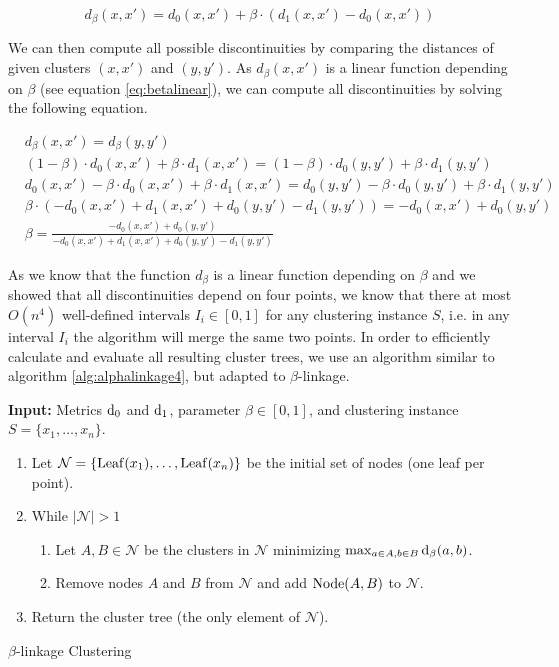 \begin{equation}
d_\beta(x,x') = d_0(x,x') + \beta \cdot (d_1(x,x') - d_0(x,x'))
\label{eq:betalinear}
\end{equation}

We can then compute all possible discontinuities by comparing the distances of given clusters $(x, x')$ and $(y, y')$. As $d_\beta(x,x')$ is a linear function depending on $\beta$ (see equation \ref{eq:betalinear}), we can compute all discontinuities by solving the following equation.

\begin{align*}
&d_\beta(x,x') = d_\beta(y,y')\\
&(1 - \beta) \cdot d_0(x,x') + \beta \cdot d_1(x,x') = (1 - \beta) \cdot d_0(y,y') + \beta \cdot d_1(y,y')\\
&d_0(x,x') - \beta \cdot d_0(x,x') + \beta \cdot d_1(x,x') = d_0(y,y') - \beta \cdot d_0(y,y') + \beta \cdot d_1(y,y')\\
&\beta \cdot (- d_0(x,x') + d_1(x,x') + d_0(y,y') - d_1(y,y')) = - d_0(x,x') + d_0(y,y')\\
&\beta = \frac{- d_0(x,x') + d_0(y,y')}{- d_0(x,x') + d_1(x,x') + d_0(y,y') - d_1(y,y')}
\label{eq:discont}
\end{align*}

As we know that the function $d_\beta$ is a linear function depending on $\beta$ and we showed that all discontinuities depend on four points, we know that there at most $O(n^4)$ well-defined intervals $I_i \in [0,1]$ for any clustering instance $S$, i.e. in any interval $I_i$ the algorithm will merge the same two points. In order to efficiently calculate and evaluate all resulting cluster trees, we use an algorithm similar to algorithm \ref{alg:alphalinkage4}, but adapted to $\beta$-linkage.

\begin{algorithm}
\textbf{Input:} Metrics $\operatorname{d_{0}}$ and $\operatorname{d_{1}}$, parameter $\beta \in [0,1]$, and clustering instance $S = \{x_1, \dots, x_n\}$.
\begin{enumerate}[nosep, leftmargin=*]
\item Let $\mathcal{N} = \{\operatorname{Leaf}(x_1), \dots, \operatorname{Leaf}(x_n)\}$ be the initial set of nodes (one leaf per point).
\item While $|\mathcal{N}| > 1$
\begin{enumerate}[nosep, leftmargin=*]
  \item Let $A, B \in \mathcal{N}$ be the clusters in $\mathcal{N}$ minimizing $\max_{a \in A, b \in B} \operatorname{d_{\beta}}(a, b)$.
  \item Remove nodes $A$ and $B$ from $\mathcal{N}$ and add $\operatorname{Node}(A,B)$ to $\mathcal{N}$.
\end{enumerate}
\item Return the cluster tree (the only element of $\mathcal{N}$).
\end{enumerate}
\caption{$\beta$-linkage Clustering}
\label{alg:betalinkage}
\end{algorithm}

